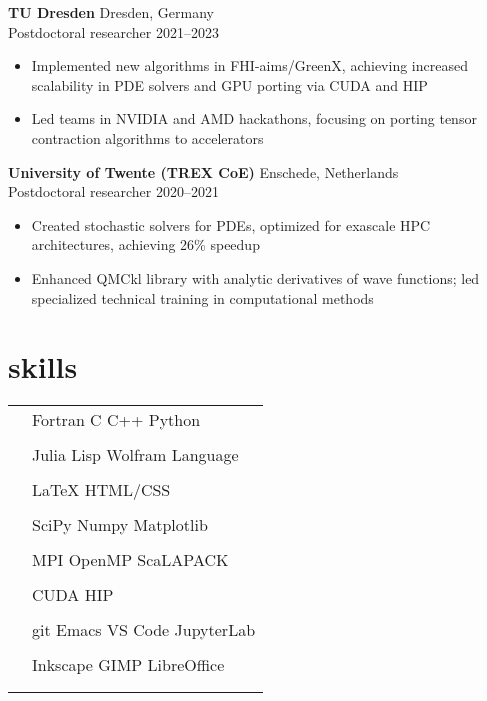 \documentclass[12pt]{article}
\newcommand{\entry}[4]{{{\textbf{#1}}} \hfill #3 \\ #2 \hfill #4}
\newcommand{\tableentry}[3]{\textsc{#1} & #2\expandafter\ifstrequal\expandafter{#3}{}{\\}{\\[6pt]}}
\begin{document}
\begin{paracol}{2}
    \entry{TU Dresden}{Postdoctoral researcher}{Dresden, Germany}{2021--2023}
    \begin{itemize}[noitemsep,leftmargin=3.5mm,rightmargin=0mm,topsep=6pt]
    \item Implemented new algorithms in FHI-aims/GreenX, achieving increased scalability in PDE solvers and GPU porting via CUDA and HIP
    \item Led teams in NVIDIA and AMD hackathons, focusing on porting tensor contraction algorithms to accelerators
    \end{itemize}

    \entry{University of Twente (TREX CoE)}{Postdoctoral researcher}{Enschede, Netherlands}{2020--2021}
    \begin{itemize}[noitemsep,leftmargin=3.5mm,rightmargin=0mm,topsep=6pt]
    \item Created stochastic solvers for PDEs, optimized for exascale HPC architectures, achieving 26\% speedup
    \item Enhanced QMCkl library with analytic derivatives of wave functions; led specialized technical training in computational methods
    \end{itemize}


    \switchcolumn{}

    \section{skills}
    \begin{supertabular}{rl}
      \tableentry{\footnotesize\faCode}{Fortran \textperiodcentered{} C
        \textperiodcentered{} C++ \textperiodcentered{} Python}{}
      \tableentry{}{Julia \textperiodcentered{} Lisp \textperiodcentered{} Wolfram Language}{}
      \tableentry{}{LaTeX \textperiodcentered{} HTML/CSS}{}
      \tableentry{\footnotesize\faCogs}{SciPy \textperiodcentered{} Numpy \textperiodcentered{} Matplotlib}{}
      \tableentry{}{MPI \textperiodcentered{} OpenMP \textperiodcentered{} ScaLAPACK}{}
      \tableentry{}{CUDA \textperiodcentered{} HIP}{}
      \tableentry{\footnotesize\faLaptop}{git \textperiodcentered{}  Emacs \textperiodcentered{} VS Code \textperiodcentered{} JupyterLab}{}
      \tableentry{}{Inkscape \textperiodcentered{} GIMP \textperiodcentered{}  LibreOffice}{}


\end{supertabular}
\end{paracol}
\end{document}
